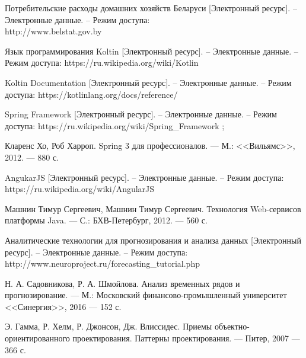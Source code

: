 
\begin{enumerate}[label={[\arabic*]}]
  \item Потребительские расходы домашних хозяйств Беларуси [Электронный ресурс]. 
  – Электронные данные. – Режим доступа: \\http://www.belstat.gov.by
  \item Язык программирования Koltin [Электронный ресурс]. 
  – Электронные данные. – Режим доступа: https://ru.wikipedia.org/wiki/Kotlin
  \item Koltin Documentation [Электронный ресурс]. 
  – Электронные данные. – Режим доступа: https://kotlinlang.org/docs/reference/
  \item Spring Framework [Электронный ресурс]. 
  – Электронные данные. – Режим доступа: https://ru.wikipedia.org/wiki/Spring\_Framework ;
  \item Кларенс Хо, Роб Харроп. Spring 3 для профессионалов. --- М.: \mbox{<<Вильямс>>}, 2012. — 880 с.
  \item AngukarJS [Электронный ресурс].
  – Электронные данные. – Режим доступа: https://ru.wikipedia.org/wiki/AngularJS
  \item Машнин Тимур Сергеевич, Машнин Тимур Сергеевич. Технология Web-сервисов платформы Java. 
  --- С.: БХВ-Петербург, 2012. --- 560 с.
  \item Аналитические технологии для прогнозирования и анализа данных [Электронный ресурс]. 
  – Электронные данные. – Режим доступа: \\http://www.neuroproject.ru/forecasting\_tutorial.php
  \item Н. А. Садовникова, Р. А. Шмойлова. Анализ временных рядов и прогнозирование.
  --- М.: Московский финансово-промышленный университет <<Синергия>>, 2016 --- 152 с.
  \item Э. Гамма, Р. Хелм, Р. Джонсон, Дж. Влиссидес. Приемы
  объектно-ориентированного проектирования. Паттерны проектирования. --- Питер,
  2007 --- 366 с.
  
\end{enumerate}